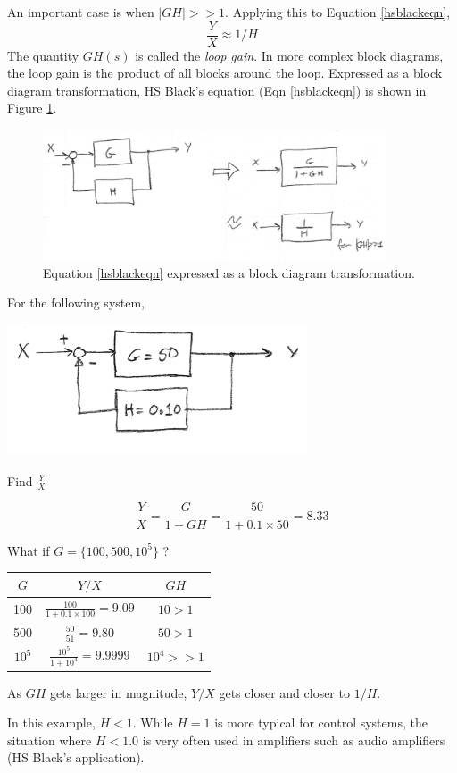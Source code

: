 An important case is when $|GH| >> 1$.   Applying this to Equation \ref{hsblackeqn},
\[
\frac{Y}{X} \approx 1/H
\]
The quantity $GH(s)$ is called the {\it loop gain}.   In more complex block diagrams, the loop gain is the product of all blocks around the loop.
Expressed as a block diagram transformation, HS Black's equation (Eqn \ref{hsblackeqn}) is shown in Figure \ref{hsblacktransforms}.


\begin{figure}\centering
\includegraphics[width=4.0in]{figs06/00770a.png}
\caption{Equation \ref{hsblackeqn} expressed as a block diagram transformation.}\label{hsblacktransforms}
\end{figure}




\begin{ExampleSmall}
For the following system,

\includegraphics[width=3.5in]{figs06/00771a.png}

Find $\frac {Y}{X}$

\[
\frac{Y}{X} = \frac {G} {1+GH} =  \frac {50 }   {1+0.1\times 50} = 8.33
\]


\vspace{0.2in}
What if $G = \{100, 500, 10^5\}$ ?

\vspace{0.1in}
\begin{tabular}{|c|c|c|} \hline
$G$         & $Y/X$      &  $GH$   \\ \hline
 100        & $\frac{100}{1+0.1\times100 } = 9.09$      &  $10>1$        \\ \hline
 500        & $\frac{50}{51} = 9.80$                    &  $50 > 1$      \\ \hline
 $10^5$     & $\frac{10^5}{1+10^4} = 9.9999$            &  $10^4 >> 1$   \\ \hline
\end{tabular}

\vspace{0.05in}
As $GH$ gets larger in magnitude, $Y/X$ gets closer and closer to $1/H$.

In this example, $H<1$.  While $H=1$ is more typical for control systems, the situation
where $H<1.0$ is very often used in amplifiers such as audio amplifiers (HS Black's application).

\end{ExampleSmall}


